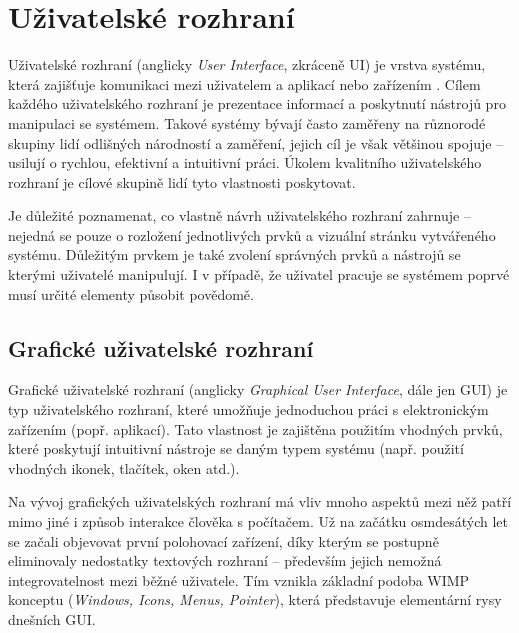 \chapter{Uživatelské rozhraní}
\label{chap:ui}

Uživatelské rozhraní (anglicky \textit{User Interface}, zkráceně UI) je vrstva systému, která zajišťuje komunikaci mezi uživatelem a aplikací nebo zařízením \cite{smashing-ui}. Cílem každého uživatelského rozhraní je prezentace informací a poskytnutí nástrojů pro manipulaci se systémem. Takové systémy bývají často zaměřeny na různorodé skupiny lidí odlišných národností a zaměření, jejich cíl je však většinou spojuje -- usilují o rychlou, efektivní a intuitivní práci. Úkolem kvalitního uživatelského rozhraní je cílové skupině lidí tyto vlastnosti poskytovat.

Je důležité poznamenat, co vlastně návrh uživatelského rozhraní zahrnuje -- nejedná se pouze o rozložení jednotlivých prvků a vizuální stránku vytvářeného systému. Důležitým prvkem je také zvolení správných prvků a nástrojů se kterými uživatelé manipulují. I v případě, že uživatel pracuje se systémem poprvé musí určité elementy působit povědomě.

\section{Grafické uživatelské rozhraní}
\label{sec:gui}

Grafické uživatelské rozhraní (anglicky \textit{Graphical User Interface}, dále jen GUI) je typ uživatelského rozhraní, které umožňuje jednoduchou práci s elektronickým zařízením (popř. aplikací). Tato vlastnost je zajištěna použitím vhodných prvků, které poskytují intuitivní nástroje se daným typem systému (např. použití vhodných ikonek, tlačítek, oken atd.).

Na vývoj grafických uživatelských rozhraní má vliv mnoho aspektů mezi něž patří mimo jiné i způsob interakce člověka s počítačem. Už na začátku osmdesátých let se začali objevovat první polohovací zařízení, díky kterým se postupně eliminovaly nedostatky textových rozhraní -- především jejich nemožná integrovatelnost mezi běžné uživatele. Tím vznikla základní podoba WIMP konceptu (\textit{Windows, Icons, Menus, Pointer}), která představuje elementární rysy dnešních GUI.

